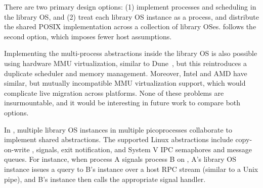 \vspace{5pt}
There are two primary design options: (1) implement processes and scheduling in 
the library OS, and (2) treat each library OS instance as a process, and distribute the shared POSIX implementation across a collection of library OSes.
\graphene{} follows the second option, which imposes fewer host assumptions.

Implementing the multi-process abstractions
inside the library OS is also possible using 
hardware MMU virtualization, similar to Dune~\cite{belay12dune},
but this reintroduces a duplicate scheduler and memory management.
Moreover, Intel and AMD have similar, but mutually incompatible MMU virtualization support,
which would complicate live migration across platforms.
None of these problems are insurmountable, and it would be interesting in future
work to compare both options.


In \graphene{}, multiple library OS instances in multiple picoprocesses collaborate to implement shared abstractions. The supported Linux abstractions include copy-on-write , signals, exit notification, and System V IPC semaphores and message queues.
For instance, when process A signals process B on \graphene{}, A's library OS instance issues a query to B's instance over a host RPC stream (similar to a Unix pipe), and B's instance then calls the appropriate signal handler.




